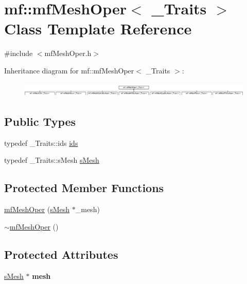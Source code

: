\hypertarget{classmf_1_1mfMeshOper}{
\section{mf::mfMeshOper$<$ \_\-Traits $>$ Class Template Reference}
\label{classmf_1_1mfMeshOper}
}


{\ttfamily \#include $<$mfMeshOper.h$>$}

Inheritance diagram for mf::mfMeshOper$<$ \_\-Traits $>$:\begin{figure}[H]
\begin{center}
\leavevmode
\includegraphics[height=0.701754cm]{classmf_1_1mfMeshOper}
\end{center}
\end{figure}
\subsection*{Public Types}
\begin{DoxyCompactItemize}
\item 
typedef \_\-Traits::ids \hyperlink{classmf_1_1mfMeshOper_a526d1466339244781fbdc0dbfe5ad210}{ids}
\item 
typedef \_\-Traits::sMesh \hyperlink{classmf_1_1mfMeshOper_a96c05da9a054cf9ac58d15211922f936}{sMesh}
\end{DoxyCompactItemize}
\subsection*{Protected Member Functions}
\begin{DoxyCompactItemize}
\item 
\hyperlink{classmf_1_1mfMeshOper_a902c507f17a7a2d8d47c3dcc5f1e2686}{mfMeshOper} (\hyperlink{classmf_1_1mfMeshOper_a96c05da9a054cf9ac58d15211922f936}{sMesh} $\ast$\_\-mesh)
\item 
\hyperlink{classmf_1_1mfMeshOper_a31338779fec74743fe804882e1e0ba59}{$\sim$mfMeshOper} ()
\end{DoxyCompactItemize}
\subsection*{Protected Attributes}
\begin{DoxyCompactItemize}
\item 
\hypertarget{classmf_1_1mfMeshOper_a5d2bd1d40dd638444d5047dd42d5ca6a}{
\hyperlink{classmf_1_1mfMeshOper_a96c05da9a054cf9ac58d15211922f936}{sMesh} $\ast$ {\bfseries mesh}}
\label{classmf_1_1mfMeshOper_a5d2bd1d40dd638444d5047dd42d5ca6a}

\end{DoxyCompactItemize}


